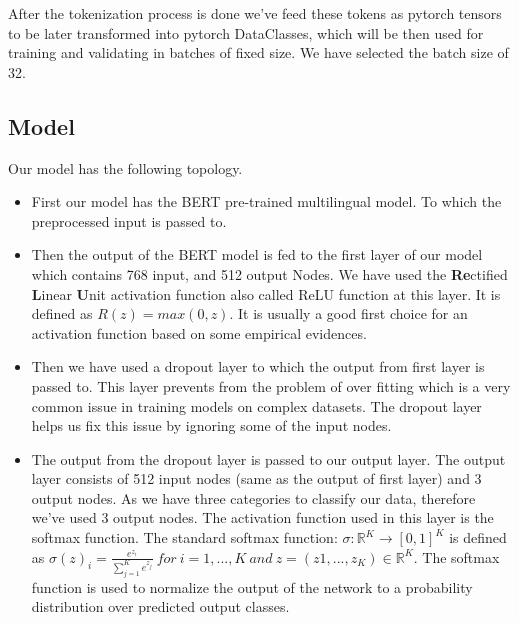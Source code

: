 \documentclass[a4paper, 12pt]{article}
\begin{document}
\begin{sloppypar}
 After the tokenization process is done we've feed these tokens as pytorch\cite{noauthor_pytorch_nodate}
  tensors to be later transformed into pytorch DataClasses, which will be then used for training and validating in batches of fixed size. We have selected the batch size of 32.
  
  \subsection{Model}
  
  Our model has the following topology.
  \begin{itemize}
  \item{First our model has the BERT pre-trained multilingual model. To which the preprocessed input is passed to.}
  
  \item{Then the output of the BERT model is fed to the first layer of our model which contains 768 input, and 512 output Nodes. We have used the \textbf{Re}ctified \textbf{L}inear \textbf{U}nit activation function also called ReLU function at this layer. It is defined as $R(z) = max(0,z)$. It is usually a good first choice for an activation function based on some empirical evidences.}
  
  \item{Then we have used a dropout layer to which the output from first layer is passed to. This layer prevents from the problem of over fitting which is a very common issue in training models on complex datasets. The dropout layer helps us fix this issue by ignoring some of the input nodes. }\cite{srivastava_dropout_nodate}
  
  \item{The output from the dropout layer is passed to our output layer. The output layer consists of 512 input nodes (same as the output of first layer) and 3 output nodes. As we have three categories to classify our data, therefore we've used 3 output nodes. The activation function used in this layer is the softmax function. The standard softmax function: $ \sigma : \mathbb{R}^K \rightarrow [0,1]^K $ is defined as \large
  $\sigma(z)_i = \frac{e^{z_i}}{\sum_{j = 1} ^{ K} e^{z_j}}\  for\  i = 1, ... , K\  and\  z = (z1, ..., z_K) \in \mathbb{R}^K$. 
  \normalsize
  The softmax function is used to normalize the output of the  network to a probability distribution over predicted output classes. }\cite{noauthor_softmax_2021}
  
  \end{itemize}
  

\end{sloppypar}
\end{document}
